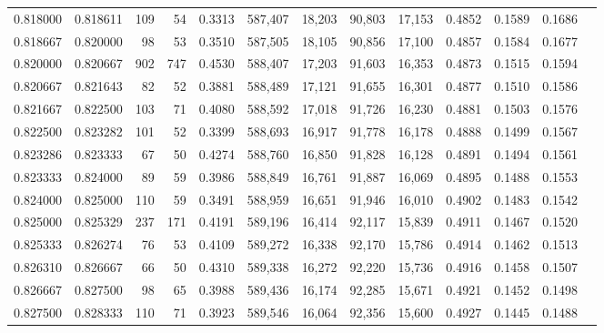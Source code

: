 \begin{tabular}{rrrrrrrrrrrrr}
0.818000 & 0.818611 &   109 &  54 &                                     0.3313 & 587,407 &  18,203 &  90,803 &  17,153 & 0.4852 & 0.1589 & 0.1686 \\
0.818667 & 0.820000 &    98 &  53 &                                     0.3510 & 587,505 &  18,105 &  90,856 &  17,100 & 0.4857 & 0.1584 & 0.1677 \\
0.820000 & 0.820667 &   902 & 747 &                                     0.4530 & 588,407 &  17,203 &  91,603 &  16,353 & 0.4873 & 0.1515 & 0.1594 \\
0.820667 & 0.821643 &    82 &  52 &                                     0.3881 & 588,489 &  17,121 &  91,655 &  16,301 & 0.4877 & 0.1510 & 0.1586 \\
0.821667 & 0.822500 &   103 &  71 &                                     0.4080 & 588,592 &  17,018 &  91,726 &  16,230 & 0.4881 & 0.1503 & 0.1576 \\
0.822500 & 0.823282 &   101 &  52 &                                     0.3399 & 588,693 &  16,917 &  91,778 &  16,178 & 0.4888 & 0.1499 & 0.1567 \\
0.823286 & 0.823333 &    67 &  50 &                                     0.4274 & 588,760 &  16,850 &  91,828 &  16,128 & 0.4891 & 0.1494 & 0.1561 \\
0.823333 & 0.824000 &    89 &  59 &                                     0.3986 & 588,849 &  16,761 &  91,887 &  16,069 & 0.4895 & 0.1488 & 0.1553 \\
0.824000 & 0.825000 &   110 &  59 &                                     0.3491 & 588,959 &  16,651 &  91,946 &  16,010 & 0.4902 & 0.1483 & 0.1542 \\
0.825000 & 0.825329 &   237 & 171 &                                     0.4191 & 589,196 &  16,414 &  92,117 &  15,839 & 0.4911 & 0.1467 & 0.1520 \\
0.825333 & 0.826274 &    76 &  53 &                                     0.4109 & 589,272 &  16,338 &  92,170 &  15,786 & 0.4914 & 0.1462 & 0.1513 \\
0.826310 & 0.826667 &    66 &  50 &                                     0.4310 & 589,338 &  16,272 &  92,220 &  15,736 & 0.4916 & 0.1458 & 0.1507 \\
0.826667 & 0.827500 &    98 &  65 &                                     0.3988 & 589,436 &  16,174 &  92,285 &  15,671 & 0.4921 & 0.1452 & 0.1498 \\
0.827500 & 0.828333 &   110 &  71 &                                     0.3923 & 589,546 &  16,064 &  92,356 &  15,600 & 0.4927 & 0.1445 & 0.1488 \\

\end{tabular}
